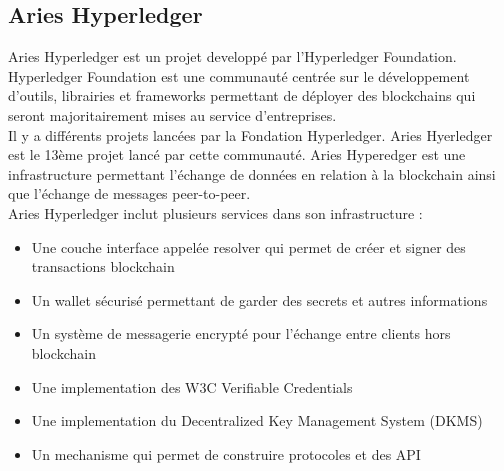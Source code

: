 \documentclass[12pt, openany]{report}
\begin{document}
\subsection{Aries Hyperledger}
\noindent 
\begin{flushleft}
Aries Hyperledger est un projet developpé par l'Hyperledger Foundation. Hyperledger Foundation est une communauté centrée sur le développement d'outils, librairies et frameworks permettant de déployer des blockchains qui seront majoritairement mises au service d'entreprises. \\
Il y a différents projets lancées par la Fondation Hyperledger. Aries Hyerledger est le 13ème projet lancé par cette communauté. Aries Hyperedger est une infrastructure permettant l'échange de données en relation à la blockchain ainsi que l'échange de messages peer-to-peer. \\
Aries Hyperledger inclut plusieurs services dans son infrastructure :
\begin{itemize}
\item Une couche interface appelée resolver qui permet de créer et signer des transactions blockchain
\item Un wallet sécurisé permettant de garder des secrets et autres informations 
\item Un système de messagerie encrypté pour l'échange entre clients hors blockchain
\item Une implementation des W3C Verifiable Credentials 
\item Une implementation du Decentralized Key Management System (DKMS)
\item Un mechanisme qui permet de construire protocoles et des API
\end{itemize}


\end{flushleft}
\end{document}
